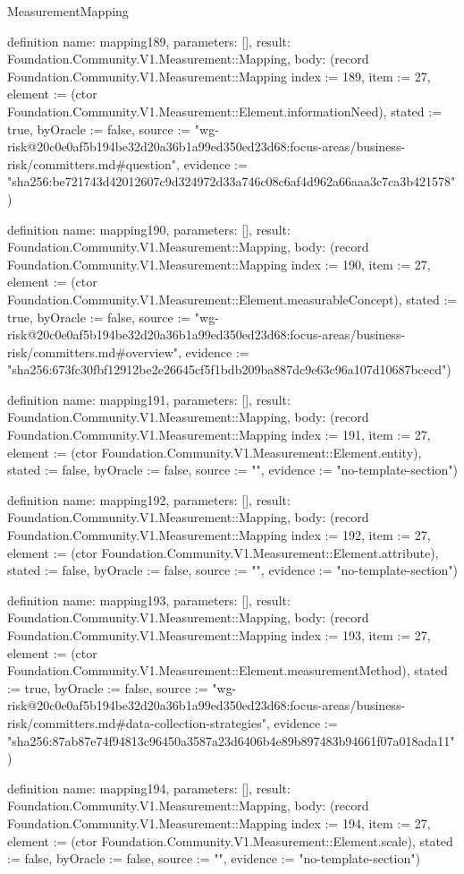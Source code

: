 \begin{lexlean}{MeasurementMapping}
\begin{semanticmodule}
definition{
  name: mapping189,
  parameters: [],
  result: Foundation.Community.V1.Measurement::Mapping,
  body: (record Foundation.Community.V1.Measurement::Mapping {index := 189, item := 27, element := (ctor Foundation.Community.V1.Measurement::Element.informationNeed), stated := true, byOracle := false, source := "wg-risk@20c0e0af5b194be32d20a36b1a99ed350ed23d68:focus-areas/business-risk/committers.md#question", evidence := "sha256:be721743d42012607c9d324972d33a746c08c6af4d962a66aaa3c7ca3b421578"})
}

definition{
  name: mapping190,
  parameters: [],
  result: Foundation.Community.V1.Measurement::Mapping,
  body: (record Foundation.Community.V1.Measurement::Mapping {index := 190, item := 27, element := (ctor Foundation.Community.V1.Measurement::Element.measurableConcept), stated := true, byOracle := false, source := "wg-risk@20c0e0af5b194be32d20a36b1a99ed350ed23d68:focus-areas/business-risk/committers.md#overview", evidence := "sha256:673fc30fbf12912be2e26645cf5f1bdb209ba887dc9e63c96a107d10687bcecd"})
}

definition{
  name: mapping191,
  parameters: [],
  result: Foundation.Community.V1.Measurement::Mapping,
  body: (record Foundation.Community.V1.Measurement::Mapping {index := 191, item := 27, element := (ctor Foundation.Community.V1.Measurement::Element.entity), stated := false, byOracle := false, source := "", evidence := "no-template-section"})
}

definition{
  name: mapping192,
  parameters: [],
  result: Foundation.Community.V1.Measurement::Mapping,
  body: (record Foundation.Community.V1.Measurement::Mapping {index := 192, item := 27, element := (ctor Foundation.Community.V1.Measurement::Element.attribute), stated := false, byOracle := false, source := "", evidence := "no-template-section"})
}

definition{
  name: mapping193,
  parameters: [],
  result: Foundation.Community.V1.Measurement::Mapping,
  body: (record Foundation.Community.V1.Measurement::Mapping {index := 193, item := 27, element := (ctor Foundation.Community.V1.Measurement::Element.measurementMethod), stated := true, byOracle := false, source := "wg-risk@20c0e0af5b194be32d20a36b1a99ed350ed23d68:focus-areas/business-risk/committers.md#data-collection-strategies", evidence := "sha256:87ab87e74f94813c96450a3587a23d6406b4e89b897483b94661f07a018ada11"})
}

definition{
  name: mapping194,
  parameters: [],
  result: Foundation.Community.V1.Measurement::Mapping,
  body: (record Foundation.Community.V1.Measurement::Mapping {index := 194, item := 27, element := (ctor Foundation.Community.V1.Measurement::Element.scale), stated := false, byOracle := false, source := "", evidence := "no-template-section"})
}


\end{semanticmodule}
\end{lexlean}
